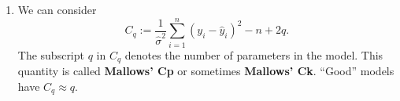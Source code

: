 \documentclass[
  a4paper,
]{article}
\theoremstyle{definition}
\theoremstyle{definition}
\theoremstyle{definition}
\theoremstyle{definition}
\theoremstyle{remark}
\begin{document}
\begin{enumerate}
  \begin{proof}
  From equation~\eqref{eq:dbeta-i} we know how the estimated regression
  coefficients change, when observation \(i\) is deleted from the model:
  \begin{equation*}
    \hat\beta^{(i)} - \hat\beta
    = - (X^\top X)^{-1} x_i \frac{\hat\varepsilon_i}{1 - h_{ii}}.
  \end{equation*}
  Thus we have
  \begin{align*}
    \hat y^{(i)}_i - \hat y_i
    &= \bigl( X \hat\beta^{(i)} - X \hat\beta \bigr)_i \\
    &= - \bigl( X (X^\top X)^{-1} x_i \frac{\hat\varepsilon_i}{1 - h_{ii}} \bigr)_i \\
    &= - x_i^\top (X^\top X)^{-1} x_i \frac{\hat\varepsilon_i}{1 - h_{ii}} \\
    &= - \frac{h_{ii}}{1 - h_{ii}} \hat\varepsilon_i.
  \end{align*}
  From this we get
  \begin{align*}
    y_i - \hat y^{(i)}_i
    &= y_i - \hat y_i + \hat y_i - \hat y^{(i)}_i \\
    &= \hat\varepsilon_i + \frac{h_{ii}}{1 - h_{ii}} \hat\varepsilon_i \\
    &= \frac{1}{1 - h_{ii}} \hat\varepsilon_i.
  \end{align*}
  Substituting this expression into the definition of PRESS
  completes the proof.
  \end{proof}
\item
  We can consider
  \begin{equation*}
    C_q
    := \frac{1}{\hat{\sigma}^2} \sum_{i=1}^n (y_i - \hat y_i)^2 - n + 2q.
  \end{equation*}
  The subscript \(q\) in \(C_q\) denotes the number of parameters in the model.
  This quantity is called \textbf{Mallows' Cp} or sometimes
  \textbf{Mallows' Ck}. ``Good'' models have \(C_q \approx q\).


\end{enumerate}
\end{document}
